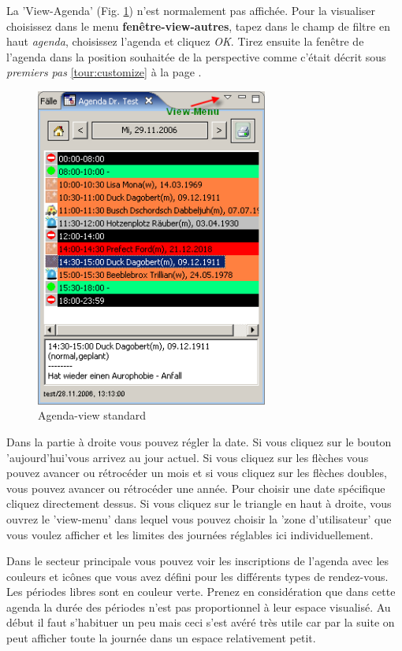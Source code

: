 La 'View-Agenda'  (Fig. \ref{fig:agenda1}) n'est normalement pas affichée.  Pour la visualiser choisissez dans le menu
 \textbf{fenêtre-view-autres}, tapez dans le champ de filtre en haut  \textit{agenda}, choisissez l'agenda et cliquez  \textit{OK}. Tirez ensuite la fenêtre de l'agenda  dans la position souhaitée de la perspective comme c'était décrit sous \textit{premiers pas} \ref{tour:customize} à la page \pageref{tour:customize}.
\begin{figure}
\includegraphics[width=3in]{images/use2.png}
\caption{Agenda-view standard}\label{fig:agenda1}
\end{figure}
Dans la partie à droite vous pouvez régler la date. Si vous cliquez sur le bouton 'aujourd'hui'vous arrivez au jour actuel.
Si vous cliquez sur les flèches vous pouvez avancer ou rétrocéder un mois et si vous cliquez sur les flèches doubles, vous pouvez avancer ou rétrocéder une année. Pour choisir une date spécifique cliquez directement dessus. Si vous cliquez sur le triangle en haut à droite, vous ouvrez le 'view-menu' dans lequel vous pouvez choisir la 'zone d'utilisateur' que vous voulez afficher et les limites des journées réglables ici individuellement.

Dans le secteur principale vous pouvez voir les inscriptions de l'agenda avec les couleurs et icônes que vous avez défini pour les différents types de rendez-vous. Les périodes libres sont en couleur verte. Prenez en considération que dans cette agenda la durée des périodes n'est pas proportionnel à leur espace visualisé. Au début il faut s'habituer un peu mais ceci s'est avéré très utile car par la suite on peut afficher toute la journée dans un espace relativement petit.

